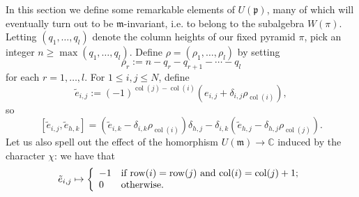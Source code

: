 \documentclass[twoside,12pt,reqno]{amsart}
\def\row{\operatorname{row}}
\def\col{\operatorname{col}}
\def\C{{\mathbb C}}
\begin{document}
In this section we define some remarkable elements of $U(\mathfrak p)$,
many of which will eventually 
turn out to be $\mathfrak m$-invariant, i.e. to
belong to the subalgebra $W(\pi)$.
Letting $(q_1,\dots,q_{l})$ denote the column heights of our fixed
pyramid $\pi$, pick an integer $n \geq \max(q_1,\dots,q_l)$.
Define $\rho = (\rho_1,\dots,\rho_l)$ by setting
\begin{equation}\label{rhodef}
\rho_r := n-q_{r} - q_{r+1} -\cdots-q_l
\end{equation}
for each $r=1,\dots,l$.
For $1 \leq i,j \leq N$, define
\begin{equation}\label{etildedef}
\tilde e_{i,j} := (-1)^{\col(j)-\col(i)} 
(e_{i,j} + \delta_{i,j} \rho_{\col(i)}),
\end{equation}
so
\begin{equation}\label{erel}
[\tilde e_{i,j}, \tilde e_{h,k}] =
(\tilde{e}_{i,k} - \delta_{i,k} \rho_{\col(i)})\delta_{h,j} 
-
\delta_{i,k} (\tilde e_{h,j} - \delta_{h,j} \rho_{\col(j)}).
\end{equation}
Let us also spell out the effect of the homorphism
$U(\mathfrak{m}) \rightarrow \C$ induced by the
character $\chi$: 
we have that
\begin{equation}\label{chidef}
\tilde e_{i,j} \mapsto \left\{
\begin{array}{ll}
-1&\hbox{if $\row(i)=\row(j)$ and $\col(i) = \col(j)+1$;}\\
0&\hbox{otherwise.}
\end{array}\right.
\end{equation}
\end{document}
